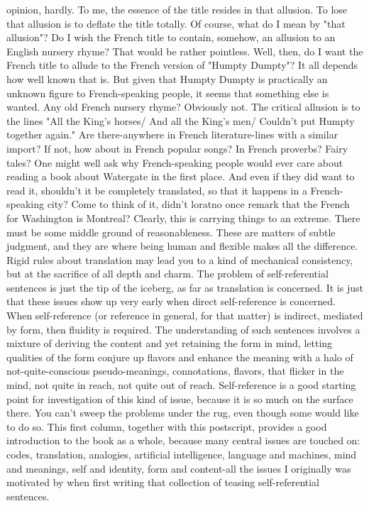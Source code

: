 opinion, hardly. To me, the essence of the title resides in that allusion. To lose that allusion is to deflate the title totally. Of course, what do I mean by "that allusion"? Do I wish the French title to contain, somehow, an allusion to an English nursery rhyme? That would be rather pointless. Well, then, do I want the French title to allude to the French version of "Humpty Dumpty"? It all depends how well known that is. But given that Humpty Dumpty is practically an unknown figure to French-speaking people, it seems that something else is wanted. Any old French nursery rhyme? Obviously not. The critical allusion is to the lines "All the King's horses/ And all the King's men/ Couldn't put Humpty together again." Are there-anywhere in French literature-lines with a similar import? If not, how about in French popular songs? In French proverbs? Fairy tales? One might well ask why French-speaking people would ever care about reading a book about Watergate in the first place. And even if they did want to read it, shouldn't it be completely translated, so that it happens in a French-speaking city? Come to think of it, didn't loratno once remark that the French for Washington is Montreal? Clearly, this is carrying things to an extreme. There must be some middle ground of reasonableness. These are matters of subtle judgment, and they are where being human and flexible makes all the difference. Rigid rules about translation may lead you to a kind of mechanical consistency, but at the sacrifice of all depth and charm. The problem of self-referential sentences is just the tip of the iceberg, as far as translation is concerned. It is just that these issues show up very early when direct self-reference is concerned. When self-reference (or reference in general, for that matter) is indirect, mediated by form, then fluidity is required. The understanding of such sentences involves a mixture of deriving the content and yet retaining the form in mind, letting qualities of the form conjure up flavors and enhance the meaning with a halo of not-quite-conscious pseudo-meanings, connotations, flavors, that flicker in the mind, not quite in reach, not quite out of reach. Self-reference is a good starting point for investigation of this kind of issue, because it is so much on the surface there. You can't sweep the problems under the rug, even though some would like to do so. 
\separator
This first column, together with this postscript, provides a good introduction to the book as a whole, because many central issues are touched on: codes, translation, analogies, artificial intelligence, language and machines, mind and meanings, self and identity, form and content-all the issues I originally was motivated by when first writing that collection of teasing self-referential sentences. 



